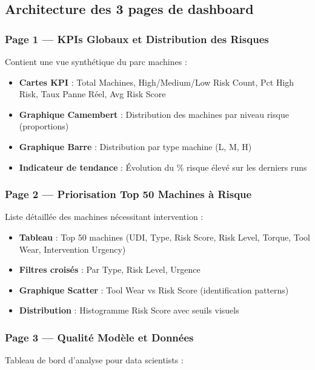 \documentclass[a4paper,12pt,twoside]{report}
\begin{document}
\subsection{Architecture des 3 pages de dashboard}

\subsubsection{Page 1 — KPIs Globaux et Distribution des Risques}

Contient une vue synthétique du parc machines :

\begin{itemize}
    \item \textbf{Cartes KPI} : Total Machines, High/Medium/Low Risk Count, Pct High Risk, Taux Panne Réel, Avg Risk Score
    \item \textbf{Graphique Camembert} : Distribution des machines par niveau risque (proportions)
    \item \textbf{Graphique Barre} : Distribution par type machine (L, M, H)
    \item \textbf{Indicateur de tendance} : Évolution du \% risque élevé sur les derniers runs
\end{itemize}

\subsubsection{Page 2 — Priorisation Top 50 Machines à Risque}

Liste détaillée des machines nécessitant intervention :

\begin{itemize}
    \item \textbf{Tableau} : Top 50 machines (UDI, Type, Risk Score, Risk Level, Torque, Tool Wear, Intervention Urgency)
    \item \textbf{Filtres croisés} : Par Type, Risk Level, Urgence
    \item \textbf{Graphique Scatter} : Tool Wear vs Risk Score (identification patterns)
    \item \textbf{Distribution} : Histogramme Risk Score avec seuils visuels
\end{itemize}

\subsubsection{Page 3 — Qualité Modèle et Données}

Tableau de bord d'analyse pour data scientists :
\end{document}
